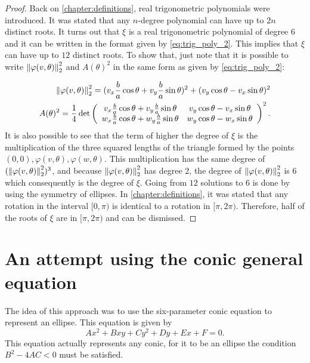 \begin{proof}
	
Back on \autoref{chapter:definitions}, real trigonometric polynomials were introduced. It was stated that any $n$-degree polynomial can have up to $2n$ distinct roots. It turns out that $\xi$ is a real trigonometric polynomial of degree $6$ and it can be written in the format given by \autoref{eq:trig_poly_2}. This implies that $\xi$ can have up to $12$ distinct roots.
 To show that, just note that it is possible to write $\left\lVert\varphi(v, \theta)\right\rVert_{2}^2$ and $A(\theta)^2$ in the same form as given by \autoref{eq:trig_poly_2}:
 
 \begin{align}\label{eq:dd}
 	\left\lVert\varphi(v, \theta)\right\rVert_{2}^2 = (v_x\frac{b}{a}\cos\theta + v_y\frac{b}{a}\sin\theta)^2 + (v_y\cos\theta - v_x\sin\theta)^2\\
 	\label{eq:dd2} A(\theta)^2=\dfrac{1}{4}\det\left(
 	\begin{array}{cc}
 		v_x\frac{b}{a}\cos\theta + v_y\frac{b}{a}\sin\theta&v_y\cos\theta - v_x\sin\theta\\
 		w_x\frac{b}{a}\cos\theta + w_y\frac{b}{a}\sin\theta&w_y\cos\theta - w_x\sin\theta
 	\end{array}\right)^2.
 \end{align}
  It is also possible to see that the term of higher the degree of $\xi$ is the multiplication of the three squared lengths of the triangle formed by the points $(0, 0), \varphi(v, \theta), \varphi(w, \theta)$. This multiplication has the same degree of $(\left\lVert\varphi(v, \theta)\right\rVert_{2}^2)^3$, and because $\left\lVert\varphi(v, \theta)\right\rVert_{2}^2$ has degree $2$, the degree of $\left\lVert\varphi(v, \theta)\right\rVert_{2}^2$ is $6$ which consequently is the degree of $\xi$.
Going from $12$ solutions to $6$ is done by using the symmetry of ellipses. In \autoref{chapter:definitions}, it was stated that any rotation in the interval $[0, \pi)$ is identical to a rotation in $[\pi, 2\pi)$. Therefore, half of the roots of $\xi$ are in $[\pi, 2\pi)$ and can be dismissed.
\end{proof}

\section{An attempt using the conic general equation}

The idea of this approach was to use the six-parameter conic equation to represent an ellipse. This equation is given by
\begin{equation}\label{eq:gen_ellipse}
Ax^2+Bxy+Cy^2+Dy+Ex+F=0.
\end{equation}
This equation actually represents any conic, for it to be an ellipse the condition $B^2 -4AC < 0$ must be satisfied.

